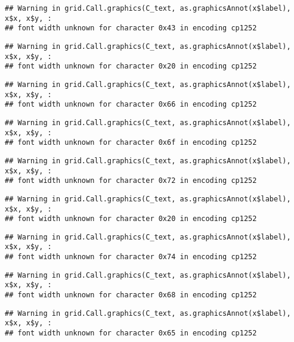 \documentclass[
]{article}
\begin{document}
\begin{verbatim}
## Warning in grid.Call.graphics(C_text, as.graphicsAnnot(x$label), x$x, x$y, :
## font width unknown for character 0x43 in encoding cp1252
\end{verbatim}

\begin{verbatim}
## Warning in grid.Call.graphics(C_text, as.graphicsAnnot(x$label), x$x, x$y, :
## font width unknown for character 0x20 in encoding cp1252
\end{verbatim}

\begin{verbatim}
## Warning in grid.Call.graphics(C_text, as.graphicsAnnot(x$label), x$x, x$y, :
## font width unknown for character 0x66 in encoding cp1252
\end{verbatim}

\begin{verbatim}
## Warning in grid.Call.graphics(C_text, as.graphicsAnnot(x$label), x$x, x$y, :
## font width unknown for character 0x6f in encoding cp1252
\end{verbatim}

\begin{verbatim}
## Warning in grid.Call.graphics(C_text, as.graphicsAnnot(x$label), x$x, x$y, :
## font width unknown for character 0x72 in encoding cp1252
\end{verbatim}

\begin{verbatim}
## Warning in grid.Call.graphics(C_text, as.graphicsAnnot(x$label), x$x, x$y, :
## font width unknown for character 0x20 in encoding cp1252
\end{verbatim}

\begin{verbatim}
## Warning in grid.Call.graphics(C_text, as.graphicsAnnot(x$label), x$x, x$y, :
## font width unknown for character 0x74 in encoding cp1252
\end{verbatim}

\begin{verbatim}
## Warning in grid.Call.graphics(C_text, as.graphicsAnnot(x$label), x$x, x$y, :
## font width unknown for character 0x68 in encoding cp1252
\end{verbatim}

\begin{verbatim}
## Warning in grid.Call.graphics(C_text, as.graphicsAnnot(x$label), x$x, x$y, :
## font width unknown for character 0x65 in encoding cp1252
\end{verbatim}
\end{document}
